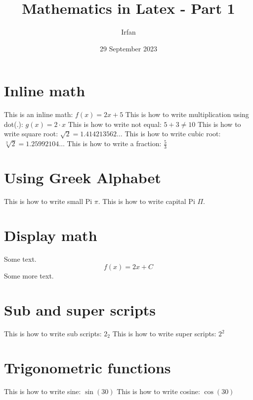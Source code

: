 \documentclass{article}
\title{Mathematics in Latex - Part 1}
\author{Irfan}
\date{29 September 2023}
\begin{document}
\maketitle

\section{Inline math}
This is an inline math: $f(x) = 2x + 5$
\newline This is how to write multiplication using dot(.): $g(x) = 2 \cdot x$
\newline This is how to write not equal: $5 + 3 \ne 10$
\newline This is how to write square root: $\sqrt{2} = 1.414213562\ldots$
\newline This is how to write cubic root: $\sqrt[3]{2} = 1.25992104\ldots$
\newline This is how to write a fraction: $\frac{5}{3}$

\section{Using Greek Alphabet}
This is how to write small Pi $\pi$.
\newline This is how to write capital Pi $\Pi$.

\section{Display math}

Some text. \[f(x) = 2x + C\] Some more text.

\section{Sub and super scripts}
This is how to write sub scripts: $2_{2}$
\newline This is how to write super scripts: $2^{2}$

\section{Trigonometric functions}
This is how to write sine: $\sin(30)$
\newline This is how to write cosine: $\cos(30)$
\end{document}
